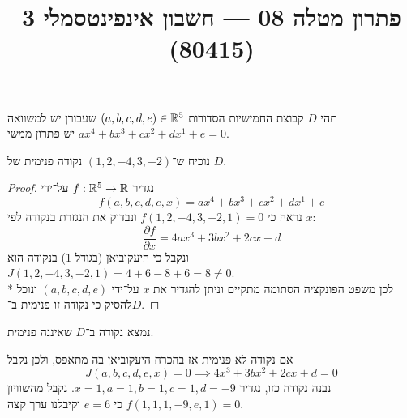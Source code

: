 
\title{פתרון מטלה 08 --- חשבון אינפינטסמלי 3 (80415)}


\maketitle
\maketitleprint{}

\Question{}
תהי $D$ קבוצת החמישיות הסדורות $(a, b, c, d, e) \in \mathbb{R}^5$ שעבורן יש למשוואה $ax^4 + bx^3 + cx^2 + dx^1 + e = 0$ יש פתרון ממשי.

\Subquestion{}
נוכיח ש־$(1, 2, -4, 3, -2)$ נקודה פנימית של $D$.
\begin{proof}
	נגדיר $f : \mathbb{R}^5 \to \mathbb{R}$ על־ידי
	\[
		f(a, b, c, d, e, x) = ax^4 + bx^3 + cx^2 + dx^1 + e
	\]
	נראה כי $f(1, 2, -4, 3, -2, 1) = 0$ ונבדוק את הנגזרת בנקודה לפי $x$:
	\[
		\frac{\partial f}{\partial x} = 4ax^3 + 3bx^2 + 2cx + d
	\]
	ונקבל כי היעקוביאן (בגודל 1) בנקודה הוא $J(1, 2, -4, 3, -2, 1) = 4 + 6 - 8 + 6 = 8 \ne 0$. \\*
	לכן משפט הפונקציה הסתומה מתקיים וניתן להגדיר את $x$ על־ידי $(a, b, c, d, e)$ ונוכל להסיק כי נקודה זו פנימית ב־$D$.
\end{proof}

\Subquestion{}
נמצא נקודה ב־$D$ שאיננה פנימית.

אם נקודה לא פנימית אז בהכרח היעקוביאן בה מתאפס, ולכן נקבל
\[
	J(a, b, c, d, e, x) = 0
	\implies
	4x^3 + 3bx^2 + 2cx + d = 0
\]
נבנה נקודה כזו, נגדיר $x = 1, a = 1, b = 1, c = 1, d = -9$.
נקבל מהשוויון $f(1, 1, 1, -9, e, 1) = 0$ כי $e = 6$ וקיבלנו ערך קצה.

